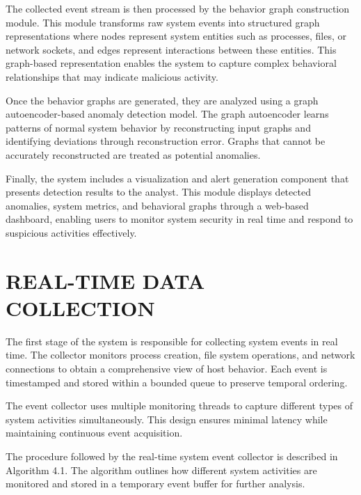 The collected event stream is then processed by the behavior graph construction module. This module transforms raw system events into structured graph representations where nodes represent system entities such as processes, files, or network sockets, and edges represent interactions between these entities. This graph-based representation enables the system to capture complex behavioral relationships that may indicate malicious activity.

Once the behavior graphs are generated, they are analyzed using a graph autoencoder-based anomaly detection model. The graph autoencoder learns patterns of normal system behavior by reconstructing input graphs and identifying deviations through reconstruction error. Graphs that cannot be accurately reconstructed are treated as potential anomalies.

Finally, the system includes a visualization and alert generation component that presents detection results to the analyst. This module displays detected anomalies, system metrics, and behavioral graphs through a web-based dashboard, enabling users to monitor system security in real time and respond to suspicious activities effectively.


\section{\uppercase{REAL-TIME DATA COLLECTION}}

The first stage of the system is responsible for collecting system events in real time. The collector monitors process creation, file system operations, and network connections to obtain a comprehensive view of host behavior. Each event is timestamped and stored within a bounded queue to preserve temporal ordering.

The event collector uses multiple monitoring threads to capture different types of system activities simultaneously. This design ensures minimal latency while maintaining continuous event acquisition.

The procedure followed by the real-time system event collector is described in Algorithm 4.1. The algorithm outlines how different system activities are monitored and stored in a temporary event buffer for further analysis.

